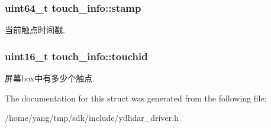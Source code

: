 \subsubsection[{\texorpdfstring{stamp}{stamp}}]{\setlength{\rightskip}{0pt plus 5cm}uint64\+\_\+t touch\+\_\+info\+::stamp}\hypertarget{structtouch__info_a6ee6ed6d0b734d51e32824e254be4866}{}\label{structtouch__info_a6ee6ed6d0b734d51e32824e254be4866}
当前触点时间戳. 
\subsubsection[{\texorpdfstring{touchid}{touchid}}]{\setlength{\rightskip}{0pt plus 5cm}uint16\+\_\+t touch\+\_\+info\+::touchid}\hypertarget{structtouch__info_a70be44e377e02cec5b4ecbb1c63f77dd}{}\label{structtouch__info_a70be44e377e02cec5b4ecbb1c63f77dd}
屏幕box中有多少个触点. 

The documentation for this struct was generated from the following file\+:\begin{DoxyCompactItemize}
\item 
/home/yang/tmp/sdk/include/ydlidar\+\_\+driver.\+h\end{DoxyCompactItemize}
